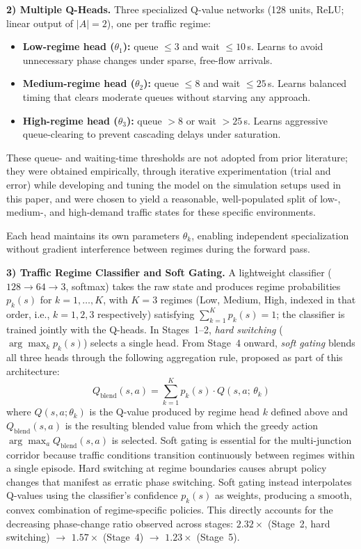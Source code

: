 \documentclass[lettersize,journal]{IEEEtran}
\begin{document}
\textbf{2) Multiple Q-Heads.}
Three specialized Q-value networks (128 units, ReLU; linear output of
$|A|=2$), one per traffic regime:
\begin{itemize}
    \item \textbf{Low-regime head ($\theta_1$):} queue $\leq 3$ and
          wait $\leq 10$\,s. Learns to avoid unnecessary phase changes
          under sparse, free-flow arrivals.
    \item \textbf{Medium-regime head ($\theta_2$):} queue $\leq 8$ and
          wait $\leq 25$\,s. Learns balanced timing that clears moderate
          queues without starving any approach.
    \item \textbf{High-regime head ($\theta_3$):} queue $>8$ or
          wait $>25$\,s. Learns aggressive queue-clearing to prevent
          cascading delays under saturation.
\end{itemize}
These queue- and waiting-time thresholds are not adopted from prior
literature; they were obtained empirically, through iterative
experimentation (trial and error) while developing and tuning the model
on the simulation setups used in this paper, and were chosen to yield a
reasonable, well-populated split of low-, medium-, and high-demand traffic
states for these specific environments.

Each head maintains its own parameters $\theta_k$, enabling independent
specialization without gradient interference between regimes during the forward pass.

\textbf{3) Traffic Regime Classifier and Soft Gating.}
A lightweight classifier ($128\to64\to3$, softmax) takes the raw state
and produces regime probabilities $p_k(s)$ for $k=1,\dots,K$, with $K=3$
regimes (Low, Medium, High, indexed in that order, i.e., $k=1,2,3$
respectively) satisfying $\sum_{k=1}^{K}p_k(s)=1$; the classifier is
trained jointly with the Q-heads. In Stages~1--2, \emph{hard switching}
($\arg\max_k p_k(s)$) selects a single head. From Stage~4 onward,
\emph{soft gating} blends all three heads through the following
aggregation rule, proposed as part of this architecture:
\begin{equation}
\label{eq:blend}
Q_{\text{blend}}(s,a) = \sum_{k=1}^{K} p_k(s)\cdot Q(s,a;\,\theta_k)
\end{equation}
where $Q(s,a;\theta_k)$ is the Q-value produced by regime head $k$ defined
above and $Q_{\text{blend}}(s,a)$ is the resulting blended value from which
the greedy action $\arg\max_a Q_{\text{blend}}(s,a)$ is selected. Soft
gating is essential
for the multi-junction corridor because traffic conditions transition
continuously between regimes within a single episode. Hard switching at
regime boundaries causes abrupt policy changes that manifest as erratic
phase switching. Soft gating instead interpolates Q-values using the
classifier's confidence $p_k(s)$ as weights, producing a smooth, convex
combination of regime-specific policies. This directly accounts for
the decreasing phase-change ratio observed across stages: $2.32\times$
(Stage~2, hard switching) $\to$ $1.57\times$ (Stage~4) $\to$ $1.23\times$
(Stage~5).
\end{document}
